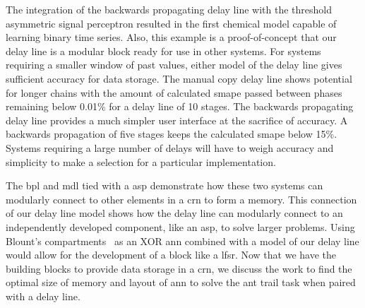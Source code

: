 The integration of the backwards propagating delay line with the threshold asymmetric signal perceptron resulted in the first chemical model capable of learning binary time series. Also, this example is a proof-of-concept that our delay line is a modular block ready for use in other systems. For systems requiring a smaller window of past values, either model of the delay line gives sufficient accuracy for data storage. The manual copy delay line shows potential for longer chains with the amount of calculated \gls{smape} passed between phases remaining below 0.01\% for a delay line of 10 stages. The backwards propagating delay line provides a much simpler user interface at the sacrifice of accuracy. A backwards propagation of five stages keeps the calculated \gls{smape} below 15\%. Systems requiring a large number of delays will have to weigh accuracy and simplicity to make a selection for a particular implementation.

The \gls{bpl} and \gls{mdl} tied with a \gls{asp} demonstrate how these two systems can modularly connect to other elements in a \gls{crn} to form a memory. This connection of our delay line model shows how the delay line can modularly connect to an independently developed component, like an \gls{asp}, to solve larger problems. Using Blount's compartments~\cite{Blount_undated-ro} as an XOR \gls{ann} combined with a model of our delay line would allow for the development of a block like a \gls{lfsr}. Now that we have the building blocks to provide data storage in a \gls{crn}, we discuss the work to find the optimal size of memory and layout of \gls{ann} to solve the ant trail task when paired with a delay line.


